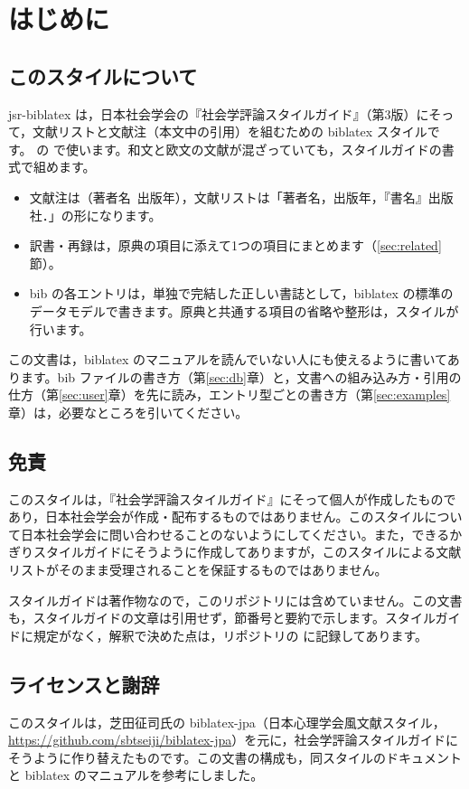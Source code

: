 \section{はじめに}\label{sec:intro}
\subsection{このスタイルについて}
jsr-biblatex は，日本社会学会の『社会学評論スタイルガイド』（第3版）にそって，文献リストと文献注（本文中の引用）を組むための biblatex スタイルです。 の  で使います。和文と欧文の文献が混ざっていても，スタイルガイドの書式で組めます。

\begin{itemize}
\item 文献注は（著者名\ 出版年），文献リストは「著者名，出版年，『書名』出版社．」の形になります。
\item 訳書・再録は，原典の項目に添えて1つの項目にまとめます（\ref{sec:related} 節）。
\item bib の各エントリは，単独で完結した正しい書誌として，biblatex の標準のデータモデルで書きます。原典と共通する項目の省略や整形は，スタイルが行います。
\end{itemize}

この文書は，biblatex のマニュアルを読んでいない人にも使えるように書いてあります。bib ファイルの書き方（第\ref{sec:db}章）と，文書への組み込み方・引用の仕方（第\ref{sec:user}章）を先に読み，エントリ型ごとの書き方（第\ref{sec:examples}章）は，必要なところを引いてください。

\subsection{免責}
このスタイルは，『社会学評論スタイルガイド』にそって個人が作成したものであり，日本社会学会が作成・配布するものではありません。このスタイルについて日本社会学会に問い合わせることのないようにしてください。また，できるかぎりスタイルガイドにそうように作成してありますが，このスタイルによる文献リストがそのまま受理されることを保証するものではありません。

スタイルガイドは著作物なので，このリポジトリには含めていません。この文書も，スタイルガイドの文章は引用せず，節番号と要約で示します。スタイルガイドに規定がなく，解釈で決めた点は，リポジトリの  に記録してあります。

\subsection{ライセンスと謝辞}
このスタイルは，芝田征司氏の biblatex-jpa（日本心理学会風文献スタイル，\url{https://github.com/sbtseiji/biblatex-jpa}）を元に，社会学評論スタイルガイドにそうように作り替えたものです。この文書の構成も，同スタイルのドキュメントと biblatex のマニュアルを参考にしました。

